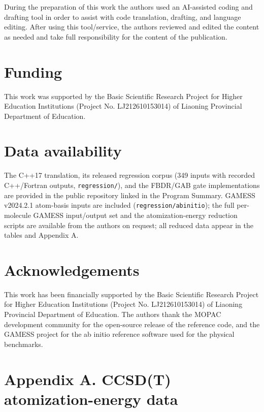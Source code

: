\documentclass[preprint,12pt]{elsarticle}
\begin{document}
During the preparation of this work the authors used an AI-assisted coding and drafting tool in order to assist with code translation, drafting, and language editing. After using this tool/service, the authors reviewed and edited the content as needed and take full responsibility for the content of the publication.



\section{Funding}

This work was supported by the Basic Scientific Research Project for Higher Education Institutions (Project No. LJ212610153014) of Liaoning Provincial Department of Education.



\section{Data availability}

The C++17 translation, its released regression corpus (349 inputs with recorded C++/Fortran outputs, \texttt{regression/}), and the FBDR/GAB gate implementations are provided in the public repository linked in the Program Summary. GAMESS v2024.2.1 atom-basis inputs are included (\texttt{regression/abinitio}); the full per-molecule GAMESS input/output set and the atomization-energy reduction scripts are available from the authors on request; all reduced data appear in the tables and Appendix A.



\section{Acknowledgements}

This work has been financially supported by the Basic Scientific Research Project for Higher Education Institutions (Project No. LJ212610153014) of Liaoning Provincial Department of Education. The authors thank the MOPAC development community for the open-source release of the reference code, and the GAMESS project for the ab initio reference software used for the physical benchmarks.



\section{Appendix A. CCSD(T) atomization-energy data}
\end{document}
